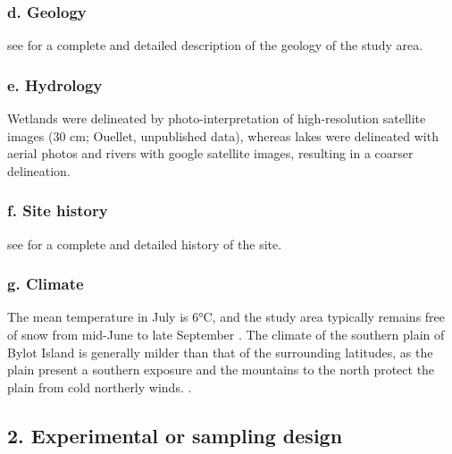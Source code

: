 \documentclass[a4paper,twoside,10pt]{article}
\begin{document}
            	\subsubsection*{d. Geology} see \citet{klassen1993} for a complete and detailed description of the geology of the study area.
            	\subsubsection*{e. Hydrology} Wetlands were delineated by photo-interpretation of high-resolution satellite images (30 cm; Ouellet, unpublished data), whereas lakes were delineated with aerial photos and rivers with google satellite images, resulting in a coarser delineation.
            	\subsubsection*{f. Site history} see \citet{gauthier2024a, gauthier2024b}  for a complete and detailed history of the site.
            	\subsubsection*{g. Climate} The mean temperature in July is 6°C, and the study area typically remains free of snow from mid-June to late September \citep{gauthier2013}. The climate of the southern plain of Bylot Island is generally milder than that of the surrounding latitudes, as the plain present a southern exposure and the mountains to the north protect the plain from cold northerly winds. \citep{gauthier2024a}.
 \newpage
       
      	\subsection*{2. Experimental or sampling design}
\end{document}

